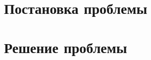 \documentclass[a4paper, 12pt]{report}
\begin{document}
\chapter{Постановка проблемы}



\chapter{Решение проблемы}



\printbibliography
\end{document}
